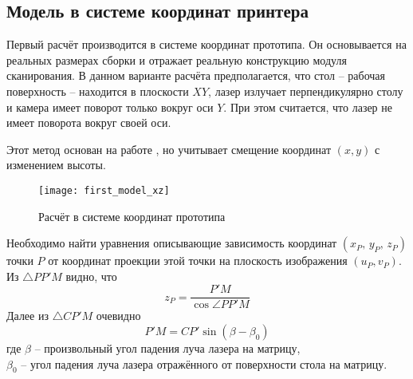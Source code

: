         \subsection{Модель в системе координат принтера}
            Первый расчёт производится в системе координат прототипа. Он основывается на реальных размерах сборки и отражает реальную конструкцию модуля сканирования. В данном варианте расчёта предполагается, что стол -- рабочая поверхность -- находится в плоскости $ XY $, лазер излучает перпендикулярно столу и камера имеет поворот только вокруг оси $ Y $. При этом считается, что лазер не имеет поворота вокруг своей оси.

            Этот метод основан на работе \cite{Lee2000}, но учитывает смещение координат $ (x,y) $ с изменением высоты.

            \begin{figure}[!ht]\label{pic:first_model}
                \centering
                \texttt{[image: first\_model\_xz]}
                \caption{Расчёт в системе координат прототипа}
            \end{figure}
            
            \sloppy Необходимо найти уравнения описывающие зависимость координат $ \left(x_P,\,y_P,\,z_P\right) $ точки $ P $ от координат проекции этой точки на плоскость изображения $ \left(u_P, v_P\right) $. Из $ \triangle PP'M $ видно, что
            \begin{equation}
                z_P = \dfrac{P'M}{\cos\angle PP'M}
            \end{equation}
            Далее из $ \triangle CP'M $ очевидно
            \begin{equation}
                P'M = CP'\sin\left(\beta - \beta_0\right)
            \end{equation}
            где $ \beta $ -- произвольный угол падения луча лазера на матрицу,\\
            $\beta_0$ -- угол падения луча лазера отражённого от поверхности стола на матрицу.
            
